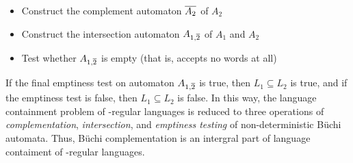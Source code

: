 \begin{itemize}
\item Construct the complement automaton $\cl1{A_2}$ of $A_2$
\item Construct the intersection automaton $A_{1,\cl1{2}}$ of $A_1$ and $A_2$
\item Test whether $A_{1,\cl1{2}}$ is empty (that is, accepts no words at all)
\end{itemize}

If the final emptiness test on automaton $A_{1,\cl1{2}}$ is true, then $L_1 \subseteq L_2$ is true, and if the emptiness test is false, then $L_1 \subseteq L_2$ is false. In this way, the language containment problem of \om-regular languages is reduced to three operations of \textit{complementation}, \textit{intersection}, and \textit{emptiness testing} of non-deterministic Büchi automata. Thus, Büchi complementation is an intergral part of language contaiment of \om-regular languages.





